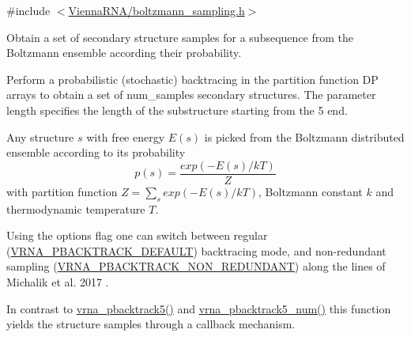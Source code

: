 {\ttfamily \#include $<$\mbox{\hyperlink{boltzmann__sampling_8h}{Vienna\+R\+N\+A/boltzmann\+\_\+sampling.\+h}}$>$}



Obtain a set of secondary structure samples for a subsequence from the Boltzmann ensemble according their probability. 

Perform a probabilistic (stochastic) backtracing in the partition function DP arrays to obtain a set of {\ttfamily num\+\_\+samples} secondary structures. The parameter {\ttfamily length} specifies the length of the substructure starting from the 5\textquotesingle{} end.

Any structure $ s $ with free energy $ E(s) $ is picked from the Boltzmann distributed ensemble according to its probability \[ p(s) = \frac{exp(-E(s) / kT)}{Z} \] with partition function $ Z = \sum_s exp(-E(s) / kT) $, Boltzmann constant $ k $ and thermodynamic temperature $ T $.

Using the {\ttfamily options} flag one can switch between regular (\mbox{\hyperlink{group__subopt__stochbt_ga760aa2fb2d5e3d7521a11454a21e9b9f}{V\+R\+N\+A\+\_\+\+P\+B\+A\+C\+K\+T\+R\+A\+C\+K\+\_\+\+D\+E\+F\+A\+U\+LT}}) backtracing mode, and non-\/redundant sampling (\mbox{\hyperlink{group__subopt__stochbt_ga9d580ce645aa0c38b69afdf56c332200}{V\+R\+N\+A\+\_\+\+P\+B\+A\+C\+K\+T\+R\+A\+C\+K\+\_\+\+N\+O\+N\+\_\+\+R\+E\+D\+U\+N\+D\+A\+NT}}) along the lines of Michalik et al. 2017 \cite{michalik:2017}.

In contrast to \mbox{\hyperlink{group__subopt__stochbt_ga72ebbe45bcbce147a12f27f62b38db78}{vrna\+\_\+pbacktrack5()}} and \mbox{\hyperlink{group__subopt__stochbt_ga30c3ddff868c44eecfdb07d99a2422ba}{vrna\+\_\+pbacktrack5\+\_\+num()}} this function yields the structure samples through a callback mechanism.

